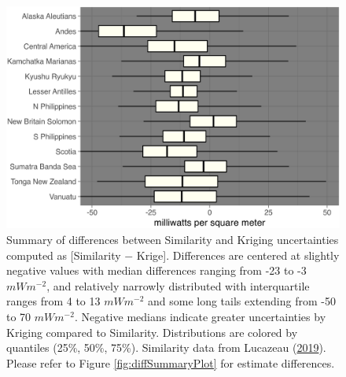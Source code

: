 \begin{figure}[htbp]

{\centering \includegraphics[width=1\linewidth,]{assets/figs/chpt3/interpSigmaDiffSummary} 

}

\caption[Summary of differences between Similarity and Kriging uncertainties]{Summary of differences between Similarity and Kriging uncertainties computed as {[}Similarity \(-\) Krige{]}. Differences are centered at slightly negative values with median differences ranging from -23 to -3 \(mWm^{-2}\), and relatively narrowly distributed with interquartile ranges from 4 to 13 \(mWm^{-2}\) and some long tails extending from -50 to 70 \(mWm^{-2}\). Negative medians indicate greater uncertainties by Kriging compared to Similarity. Distributions are colored by quantiles (25\%, 50\%, 75\%). Similarity data from Lucazeau (\protect\hyperlink{ref-lucazeau2019}{2019}). Please refer to Figure \ref{fig:diffSummaryPlot} for estimate differences.}\label{fig:sigmaDiffSummaryPlot}
\end{figure}

